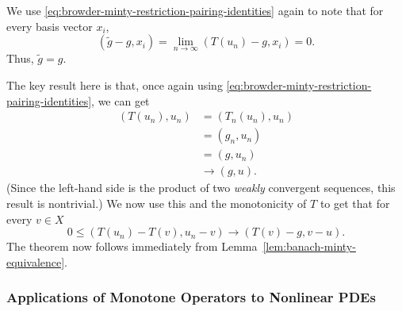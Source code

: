 \begin{Proof}
We use \eqref{eq:browder-minty-restriction-pairing-identities} again to note that for every basis vector $x_i$,
\begin{equation}\label{eq:browder-minty-identify-weak-image-limit}
(\widetilde g-g,x_i)=\lim_{n\to\infty}(T(u_n)-g,x_i)=0.
\end{equation}
Thus, $\widetilde g=g$.

The key result here is that, once again using \eqref{eq:browder-minty-restriction-pairing-identities}, we can get
\begin{equation}\label{eq:browder-minty-galerkin-weak-pairing-limit}
\begin{aligned}(T(u_n),u_n)&=(T_n(u_n),u_n)\\&=(g_n,u_n)\\&=(g,u_n)\\&\to(g,u).\end{aligned}
\end{equation}
(Since the left-hand side is the product of two \emph{weakly} convergent sequences, this result is nontrivial.) We now use this and the monotonicity of $T$ to get that for every $v\in X$
\begin{equation}\label{eq:browder-minty-monotonicity-limit-inequality}
0\leq(T(u_n)-T(v),u_n-v)\to(T(v)-g,v-u).
\end{equation}
The theorem now follows immediately from Lemma~\ref{lem:banach-minty-equivalence}.
\end{Proof}
\endgroup

\subsubsection{Applications of Monotone Operators to Nonlinear PDEs}\label{subsec:monotone-operators-nonlinear-pde-applications}

